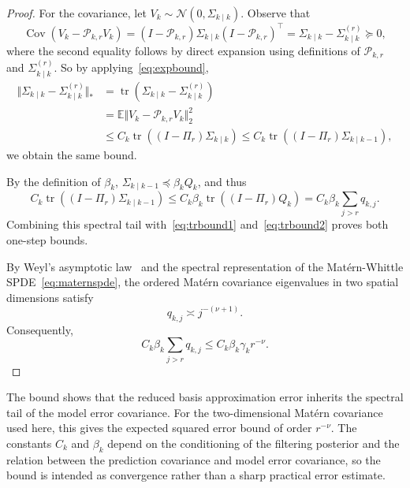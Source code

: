 \documentclass[a4paper,12pt]{article}
\begin{document}
\begin{proof}
For the covariance, let $V_k \sim \mathcal{N}(0, \Sigma_{k\mid k})$.
Observe that
\begin{equation}
    \operatorname{Cov}(V_k - \mathcal{P}_{k,r}V_k)
    = (I - \mathcal{P}_{k,r}) \Sigma_{k\mid k} (I - \mathcal{P}_{k,r})^{\top}
    = \Sigma_{k\mid k} - \Sigma_{k\mid k}^{(r)} \succeq 0,
\end{equation}
where the second equality follows by direct expansion using definitions of $\mathcal{P}_{k,r}$ and $\Sigma_{k\mid k}^{(r)}$.
So by applying~\eqref{eq:expbound},
\begin{align}
    \Vert \Sigma_{k\mid k} - \Sigma_{k\mid k}^{(r)} \Vert_{*} &= \operatorname{tr}(\Sigma_{k\mid k} - \Sigma_{k\mid k}^{(r)})\\
                                                              &= \mathbb{E}\Vert V_k - \mathcal{P}_{k,r}V_k \Vert_{2}^{2}\\
                                                              &\leq C_k \operatorname{tr}((I - \Pi_r)\Sigma_{k\mid k})
                                                              \leq  C_k \operatorname{tr}((I - \Pi_r)\Sigma_{k\mid k-1}), \label{eq:trbound2}
\end{align}
we obtain the same bound.

By the definition of $\beta_k$, $\Sigma_{k\mid k-1} \preceq \beta_k Q_k$, and thus
\begin{equation}
    C_k \operatorname{tr}((I - \Pi_r)\Sigma_{k\mid k-1})
    \leq C_k \beta_k \operatorname{tr}((I - \Pi_r) Q_k)
    = C_k \beta_k \sum_{j>r} q_{k,j}.
\end{equation}
Combining this spectral tail with~\eqref{eq:trbound1} and~\eqref{eq:trbound2} proves both one-step bounds.

By Weyl's asymptotic law~\cite[Chap. I, Sec. 3]{chavel} and the spectral representation
of the Matérn-Whittle SPDE~\eqref{eq:maternspde}, the ordered Matérn covariance  eigenvalues in two spatial dimensions satisfy
\begin{equation}
    q_{k,j} \asymp j^{-(\nu+1)}.
\end{equation}
Consequently,
\begin{equation}
    C_k \beta_k \sum_{j>r} q_{k,j} \leq  C_k \beta_k \gamma_k r^{-\nu}.
\end{equation}
\end{proof}

The bound shows that the reduced basis approximation error inherits the spectral tail of the model error covariance.
For the two-dimensional Matérn covariance used here, this gives the expected squared error bound of order $r^{-\nu}$.
The constants $C_k$ and $\beta_k$ depend on the conditioning of the filtering posterior and the relation between the prediction covariance and model error covariance, so the bound is intended as convergence rather than a sharp practical error estimate.
\end{document}
